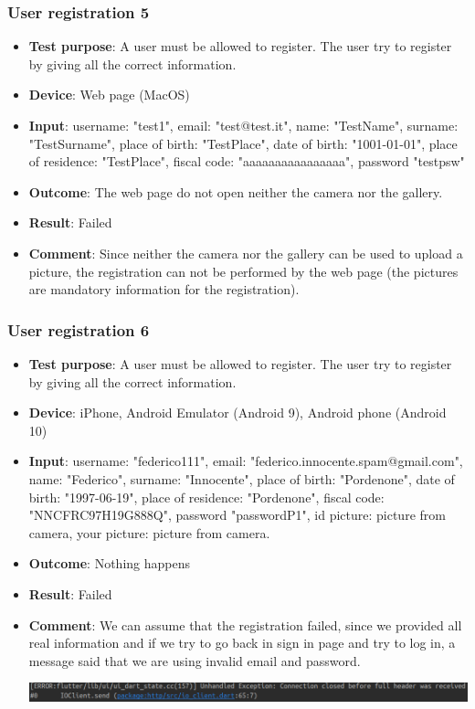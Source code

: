 \documentclass[../ATD.tex]{subfiles}
\begin{document}
    \subsubsection{User registration 5}\label{subsubsec:user-registration-5}
    \begin{itemize}
        \item \textbf{Test purpose}: A user must be allowed to register.
        The user try to register by giving all the correct information.
        \item \textbf{Device}: Web page (MacOS)
        \item \textbf{Input}: username: "test1", email: "test@test.it", name: "TestName", surname: "TestSurname", place of birth: "TestPlace", date of birth: "1001-01-01", place of residence: "TestPlace", fiscal code: "aaaaaaaaaaaaaaaa", password "testpsw"
        \item \textbf{Outcome}: The web page do not open neither the camera nor the gallery.
        \item \textbf{Result}: Failed
        \item \textbf{Comment}: Since neither the camera nor the gallery can be used to upload a picture, the registration can not be performed by the web page (the pictures are mandatory information for the registration).
    \end{itemize}

    \subsubsection{User registration 6}\label{subsubsec:user-registration-6}
    \begin{itemize}
        \item \textbf{Test purpose}: A user must be allowed to register.
        The user try to register by giving all the correct information.
        \item \textbf{Device}: iPhone, Android Emulator (Android 9), Android phone (Android 10)
        \item \textbf{Input}: username: "federico111", email: "federico.innocente.spam@gmail.com", name: "Federico", surname: "Innocente", place of birth: "Pordenone", date of birth: "1997-06-19", place of residence: "Pordenone", fiscal code: "NNCFRC97H19G888Q", password "passwordP1", id picture: picture from camera, your picture: picture from camera.
        \item \textbf{Outcome}: Nothing happens
        \item \textbf{Result}: Failed
        \item \textbf{Comment}: We can assume that the registration failed, since we provided all real information and if we try to go back in sign in page and try to log in,
        a message said that we are using invalid email and password.

        \includegraphics[scale = 0.4]{assets/statsError.png}
    \end{itemize}
\end{document}

